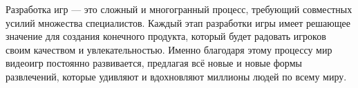 Разработка игр — это сложный и многогранный процесс, требующий совместных усилий множества специалистов. Каждый этап разработки игры имеет решающее значение для создания конечного продукта, который будет радовать игроков своим качеством и увлекательностью. Именно благодаря этому процессу мир видеоигр постоянно развивается, предлагая всё новые и новые формы развлечений, которые удивляют и вдохновляют миллионы людей по всему миру.
